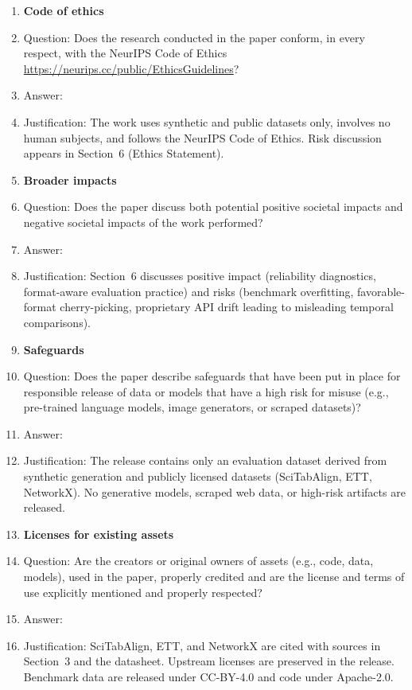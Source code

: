 \documentclass{article}
\begin{document}
\begin{enumerate}
\item {\bf Code of ethics}
    \item[] Question: Does the research conducted in the paper conform, in every respect, with the NeurIPS Code of Ethics \url{https://neurips.cc/public/EthicsGuidelines}?
    \item[] Answer: \answerYes{}
    \item[] Justification: The work uses synthetic and public datasets only, involves no human subjects, and follows the NeurIPS Code of Ethics. Risk discussion appears in Section~6 (Ethics Statement).

\item {\bf Broader impacts}
    \item[] Question: Does the paper discuss both potential positive societal impacts and negative societal impacts of the work performed?
    \item[] Answer: \answerYes{}
    \item[] Justification: Section~6 discusses positive impact (reliability diagnostics, format-aware evaluation practice) and risks (benchmark overfitting, favorable-format cherry-picking, proprietary API drift leading to misleading temporal comparisons).

\item {\bf Safeguards}
    \item[] Question: Does the paper describe safeguards that have been put in place for responsible release of data or models that have a high risk for misuse (e.g., pre-trained language models, image generators, or scraped datasets)?
    \item[] Answer: \answerNA{}
    \item[] Justification: The release contains only an evaluation dataset derived from synthetic generation and publicly licensed datasets (SciTabAlign, ETT, NetworkX). No generative models, scraped web data, or high-risk artifacts are released.

\item {\bf Licenses for existing assets}
    \item[] Question: Are the creators or original owners of assets (e.g., code, data, models), used in the paper, properly credited and are the license and terms of use explicitly mentioned and properly respected?
    \item[] Answer: \answerYes{}
    \item[] Justification: SciTabAlign, ETT, and NetworkX are cited with sources in Section~3 and the datasheet. Upstream licenses are preserved in the release. Benchmark data are released under CC-BY-4.0 and code under Apache-2.0.


\end{enumerate}
\end{document}
